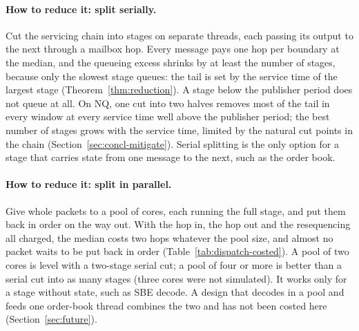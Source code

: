 \documentclass[11pt]{article}
\begin{document}
\paragraph{How to reduce it: split serially.} Cut the servicing chain into stages on
separate threads, each passing its output to the next through a mailbox hop. Every message
pays one hop per boundary at the median, and the queueing excess shrinks by at least the
number of stages, because only the slowest stage queues: the tail is set by the service
time of the largest stage (Theorem~\ref{thm:reduction}). A stage below the publisher period does not queue at all. On NQ, one cut into two halves removes most of the tail in
every window at every service time well above the publisher period; the best number of stages grows
with the service time, limited by the natural cut points in the chain
(Section~\ref{sec:concl-mitigate}). Serial splitting is the only option for a stage that
carries state from one message to the next, such as the order book.

\paragraph{How to reduce it: split in parallel.} Give whole packets to a pool of cores,
each running the full stage, and put them back in order on the way out. With the hop in,
the hop out and the resequencing all charged, the median costs two hops whatever the pool
size, and almost no packet waits to be put back in order (Table~\ref{tab:dispatch-costed}).
A pool of two cores is level with a two-stage serial cut; a pool of four or more is better
than a serial cut into as many stages (three cores were not simulated). It works only for a
stage without state, such as SBE decode. A design that decodes in a pool and feeds one
order-book thread combines the two and has not been costed here
(Section~\ref{sec:future}).
\end{document}
